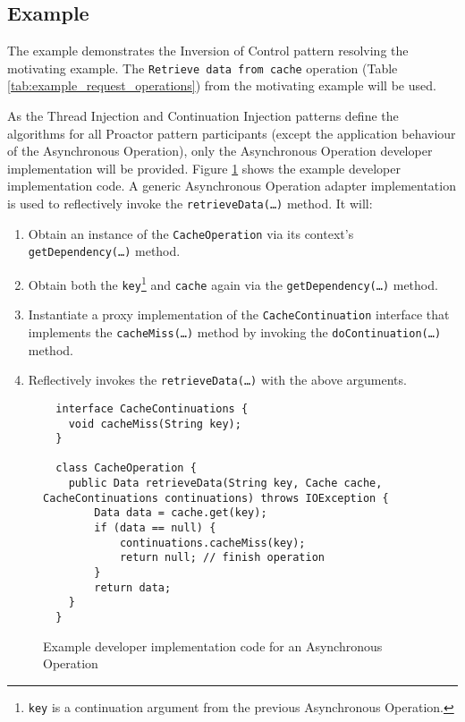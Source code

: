 \documentclass[prodmode]{style/acmlarge}
\begin{document}
\subsection{Example}

The example demonstrates the Inversion of Control pattern resolving the
motivating example.  The \texttt{Retrieve data from cache} operation (Table
\ref{tab:example_request_operations}) from the motivating example will be used.  

As the Thread Injection and Continuation Injection patterns define the
algorithms for all Proactor pattern participants (except the application
behaviour of the Asynchronous Operation), only the Asynchronous Operation
developer implementation will be provided.  Figure
\ref{fig:Example_Method_Operation} shows the example developer implementation
code.  A generic Asynchronous Operation adapter implementation is used to
reflectively invoke the \texttt{retrieveData(\ldots)} method. It will:
\begin{enumerate}
  \item Obtain an instance of the \texttt{CacheOperation} via its context's \texttt{getDependency(\ldots)} method.
  \item Obtain both the \texttt{key}\footnote{\texttt{key} is a continuation argument from the previous Asynchronous Operation.} and \texttt{cache} again via the \texttt{getDependency(\ldots)} method.
  \item Instantiate a proxy implementation of the \texttt{CacheContinuation} interface that implements the \texttt{cacheMiss(\ldots)} method by invoking the \texttt{doContinuation(\ldots)} method. 
  \item Reflectively invokes the \texttt{retrieveData(\ldots)} with the above arguments.
\end{enumerate}

\begin{figure}[tp]
\centering
\begin{verbatim}
  interface CacheContinuations {
    void cacheMiss(String key);
  }

  class CacheOperation {    
    public Data retrieveData(String key, Cache cache, CacheContinuations continuations) throws IOException {
        Data data = cache.get(key);
        if (data == null) {
            continuations.cacheMiss(key);
            return null; // finish operation
        }
        return data;
    }
  }
\end{verbatim}
\caption{Example developer implementation code for an Asynchronous Operation\footnotemark}
\label{fig:Example_Method_Operation}
\end{figure}
\end{document}
